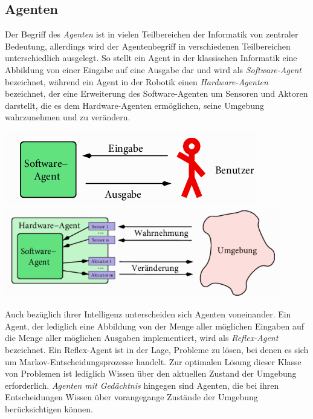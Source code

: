 \documentclass[fontsize=11pt]{scrartcl}
\newenvironment{Figure}
  {\par\medskip\noindent\minipage{\linewidth}}
  {\endminipage\par\medskip}
\newcommand*{\quelle}{%
  \footnotesize Quelle: 
}
\begin{document}
            \subsection{Agenten}
                Der Begriff des \emph{Agenten} ist in vielen Teilbereichen der Informatik von zentraler Bedeutung, allerdings wird der Agentenbegriff in verschiedenen Teilbereichen unterschiedlich ausgelegt. So stellt ein Agent in der klassischen Informatik eine Abbildung von einer Eingabe auf eine Ausgabe dar und wird als \emph{Software-Agent} bezeichnet, während ein Agent in der Robotik einen \emph{Hardware-Agenten} bezeichnet, der eine Erweiterung des Software-Agenten um Sensoren und Aktoren darstellt, die es dem Hardware-Agenten ermöglichen, seine Umgebung wahrzunehmen und zu verändern.\cite{ertel2016}
                \begin{Figure}
                    \centering
                    \includegraphics[scale=0.6]{softwareagent.png}
                    \includegraphics[scale=0.6]{hardwareagent.png}
                    \raggedleft \footnotesize\cite[S.18, Abb. 1.5, S19, Abb. 1.6]{ertel2016}
                \end{Figure}
                Auch bezüglich ihrer Intelligenz unterscheiden sich Agenten voneinander.
                Ein Agent, der lediglich eine Abbildung von der Menge aller möglichen Eingaben auf die Menge aller möglichen Ausgaben implementiert, wird als \emph{Reflex-Agent} bezeichnet. Ein Reflex-Agent ist in der Lage, Probleme zu lösen, bei denen es sich um Markov-Entscheidungsprozesse handelt. Zur optimalen Lösung dieser Klasse von Problemen ist lediglich Wissen über den aktuellen Zustand der Umgebung erforderlich.\cite{ertel2016}
                \newline
                \emph{Agenten mit Gedächtnis} hingegen sind Agenten, die bei ihren Entscheidungen Wissen über vorangegange Zustände der Umgebung berücksichtigen können.\cite{ertel2016}
            
\end{document}
